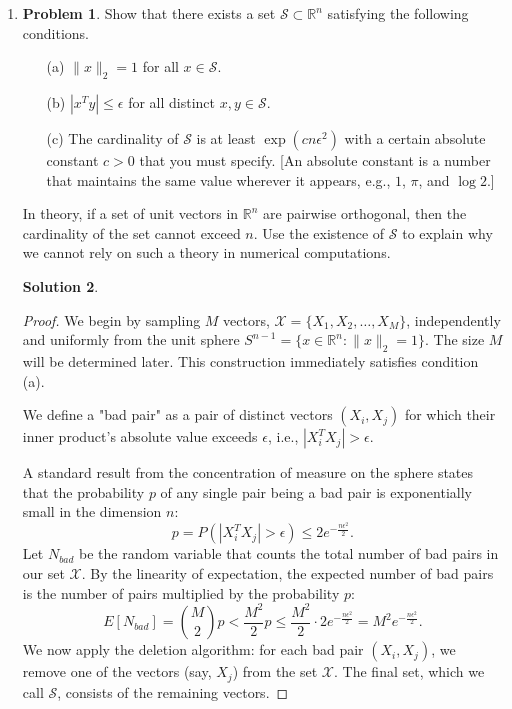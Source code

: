 \documentclass[12pt]{article}
\theoremstyle{definition}
\newtheorem*{solution}{\normalfont\textbf{Solution}}
\newtheorem*{Problem}{\noindent\textbf{Problem}}
\begin{document}
\begin{enumerate}[leftmargin=*]
\begin{solution}
\begin{proof}
\[                \]
                This completes the proof of the bound.
                \end{proof}
    \end{solution}
    \item \begin{Problem}
            Show that there exists a set \( \mathcal{S} \subset \mathbb{R}^n \) satisfying the following conditions.
            \begin{enumerate}
                \item[(a)] \( \| x \|_2 = 1 \) for all \( x \in \mathcal{S} \).
                \item[(b)] \( | x^T y | \leq \epsilon \) for all distinct \( x, y \in \mathcal{S} \).
                \item[(c)] The cardinality of \( \mathcal{S} \) is at least \( \exp(c n \epsilon^2) \) with a certain absolute constant \( c > 0 \) that you must specify. [An absolute constant is a number that maintains the same value wherever it appears, e.g., \( 1 \), \( \pi \), and \( \log 2 \).]
            \end{enumerate}
            In theory, if a set of unit vectors in \( \mathbb{R}^n \) are pairwise orthogonal, then the cardinality of the set cannot exceed \( n \). Use the existence of \( \mathcal{S} \) to explain why we cannot rely on such a theory in numerical computations.
        \end{Problem}
        \begin{solution}
            \begin{proof}
                We begin by sampling $M$ vectors, $\mathcal{X} = \{X_1, X_2, \ldots, X_M\}$, independently and uniformly from the unit sphere $S^{n-1} = \{x \in \mathbb{R}^n : \|x\|_2=1\}$. The size $M$ will be determined later. This construction immediately satisfies condition (a).

                We define a "bad pair" as a pair of distinct vectors $(X_i, X_j)$ for which their inner product's absolute value exceeds $\epsilon$, i.e., $|X_i^T X_j| > \epsilon$.

                A standard result from the concentration of measure on the sphere states that the probability $p$ of any single pair being a bad pair is exponentially small in the dimension $n$:
                \[
                p = P\left(|X_i^T X_j| > \epsilon\right) \leq 2e^{-\frac{n\epsilon^2}{2}}.
                \]
                Let $N_{bad}$ be the random variable that counts the total number of bad pairs in our set $\mathcal{X}$. By the linearity of expectation, the expected number of bad pairs is the number of pairs multiplied by the probability $p$:
                \[
                E[N_{bad}] = \binom{M}{2} p < \frac{M^2}{2} p \leq \frac{M^2}{2} \cdot 2e^{-\frac{n\epsilon^2}{2}} = M^2 e^{-\frac{n\epsilon^2}{2}}.
                \]
                We now apply the deletion algorithm: for each bad pair $(X_i, X_j)$, we remove one of the vectors (say, $X_j$) from the set $\mathcal{X}$. The final set, which we call $\mathcal{S}$, consists of the remaining vectors.


\end{proof}
\end{solution}
\end{enumerate}
\end{document}
